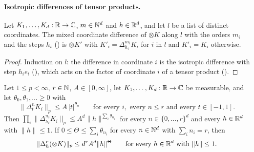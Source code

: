 \paragraph{Isotropic differences of tensor products.}

\begin{lemma}
\label{lem:tensor-kernel-mixed-differences}
\leanok
{}
Let $K_1, \dots, K_d : \mathbb{R} \to \mathbb{C}$, $m \in \mathbb{N}^d$ and $h \in \mathbb{R}^d$, and let $l$ be a list of
distinct coordinates. The mixed coordinate difference of $\otimes K$ along $l$ with the orders
$m_i$ and the steps $h_i$ () is $\otimes K'$ with
$K'_i = \Delta^{m_i}_{h_i} K_i$ for $i$ in $l$ and $K'_i = K_i$ otherwise.
\end{lemma}

\begin{proof}
\leanok
{}
Induction on $l$: the difference in coordinate $i$ is the isotropic difference with step
$h_i e_i$ (), which acts on the factor of coordinate $i$ of a tensor product
().
\end{proof}

\begin{proposition}
\label{prop:tensor-kernel-isotropic-differences}
\leanok
{}
Let $1 \leq p < \infty$, $r \in \mathbb{N}$, $A \in [0, \infty]$, let $K_1, \dots, K_d : \mathbb{R} \to \mathbb{C}$ be
measurable, and let $\theta_0, \theta_1, \dots \geq 0$ with
\[
  \|\Delta_t^n K_i\|_p \leq A \, |t|^{\theta_n}
  \qquad \text{for every } i , \text{ every } n \leq r \text{ and every } t \in [-1, 1] .
\]
Then $\prod_i \|\Delta^{n_i}_{h_i} K_i\|_p \leq A^d \|h\|^{\sum_i \theta_{n_i}}$ for every
$n \in \{0, \dots, r\}^d$ and every $h \in \mathbb{R}^d$ with $\|h\| \leq 1$. If
$0 \leq \Theta \leq \sum_i \theta_{n_i}$ for every $n \in \mathbb{N}^d$ with $\sum_i n_i = r$, then
\[
  \|\Delta_h^r (\otimes K)\|_p \leq d^r A^d \|h\|^\Theta
  \qquad \text{for every } h \in \mathbb{R}^d \text{ with } \|h\| \leq 1 .
\]
\end{proposition}

